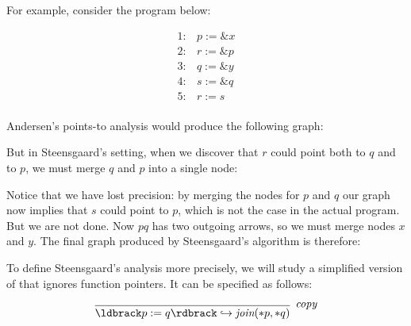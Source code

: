 \documentclass[11pt]{article}
\newcommand{\parg}[1] %
  {\ldbrack #1 \rdbrack}
\begin{document}
\begin{sloppypar}
For example, consider the program below:

\[
\begin{array}{ll}
1: & p := \&x\\
2: & r := \&p\\
3: & q := \&y\\
4: & s := \&q\\
5: & r := s\\
\end{array}
\]

Andersen's points-to analysis would produce the following graph:


But in Steensgaard's setting, when we discover that $r$ could point both to $q$ and to $p$, we must merge $q$ and $p$ into a single node:


Notice that we have lost precision: by merging the nodes for $p$ and $q$ our graph now implies that $s$ could point to $p$, which is not the case in the actual program.  But we are not done.  Now $pq$ has two outgoing arrows, so we must merge nodes $x$ and $y$.  The final graph produced by Steensgaard's algorithm is therefore:


To define Steensgaard's analysis more precisely, 
we will study a simplified version of that ignores function pointers.  It can be specified as follows:

\[
\begin{array}{c}
\infer[\textit{copy}]
	{\parg{p := q} \hookrightarrow \textit{join}(*p,*q)}
	{}\\[3ex]
	

\end{array}\]
\end{sloppypar}
\end{document}
